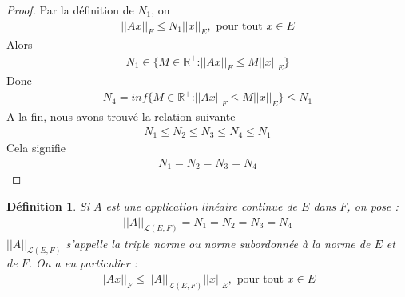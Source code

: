 \documentclass{report}
\newtheorem{Def}{Définition}[subsection]
\begin{document}
{\begin{proof}
 Par la définition de $N_{1}$, on 
			\begin{align*}
				||A x||_{F} \le N_{1} ||x||_{E},	\,\,\text{pour tout}\,\, x \in E 	
			\end{align*}
Alors  	
			\begin{align*}
				N_{1} \in \{M \in \mathbb{R}^{+} \text{:} ||A x||_{F} \le M ||x||_{E}\} 
			\end{align*}
Donc 
			\begin{align*}
				N_{4} = inf \{ M \in \mathbb{R}^{+} \text{:} ||A x||_{F} \le M ||x||_{E}\} \le N_{1} 
			\end{align*}
A la fin, nous avons trouvé la relation suivante 
			\begin{align*}
			 	N_{1} \le N_{2} \le N_{3} \le N_{4} \le N_{1}
			 \end{align*}
Cela signifie 	
			\begin{align*}
				N_{1} = N_{2} = N_{3} = N_{4}
			\end{align*}
\end{proof}



\begin{Def}
Si $A$ est une application linéaire continue de $E$ dans $F$, on pose : 		\\
			\begin{align*}
				||A||_{\mathscr{L}(E,F)} = N_{1} = N_{2} = N_{3} = N_{4} 
			\end{align*}
$||A||_{\mathscr{L}(E,F)}$ s'appelle la triple norme ou norme subordonnée à la norme de $E$ et de $F$. On a en particulier : 
			\begin{align*}
				||A x||_{F} \le ||A||_{\mathscr{L}(E,F)} ||x||_{E}, \,\,\text{pour tout}\,\, x \in E 
			\end{align*}		
\end{Def}



}
\end{document}
